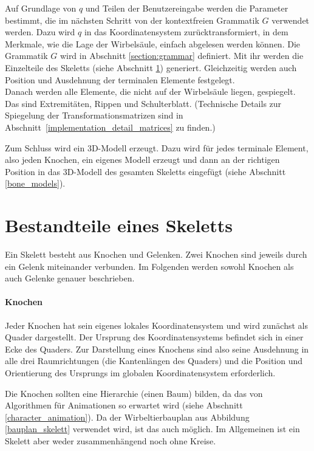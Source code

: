 Auf Grundlage von $q$ und Teilen der Benutzereingabe werden die Parameter bestimmt, die im nächsten Schritt von der kontextfreien Grammatik $G$ verwendet werden. Dazu wird $q$ in das Koordinatensystem zurücktransformiert, in dem Merkmale, wie die Lage der Wirbelsäule, einfach abgelesen werden können. Die Grammatik $G$ wird in Abschnitt \ref{section:grammar} definiert. Mit ihr werden die Einzelteile des Skeletts (siehe Abschnitt \ref{skeleton_parts}) generiert. Gleichzeitig werden auch Position und Ausdehnung der terminalen Elemente festgelegt.\\
Danach werden alle Elemente, die nicht auf der Wirbelsäule liegen, gespiegelt. Das sind Extremitäten, Rippen und Schulterblatt. (Technische Details zur Spiegelung der Transformationsmatrizen sind in \mbox{Abschnitt \ref{implementation_detail_matrices}} zu finden.)

Zum Schluss wird ein 3D-Modell erzeugt. Dazu wird für jedes terminale Element, also jeden Knochen, ein eigenes Modell erzeugt und dann an der richtigen Position in das 3D-Modell des gesamten Skeletts eingefügt (siehe Abschnitt \ref{bone_models}). 


\section{Bestandteile eines Skeletts}
\label{skeleton_parts}

Ein Skelett besteht aus Knochen und Gelenken. Zwei Knochen sind jeweils durch ein Gelenk miteinander verbunden. Im Folgenden werden sowohl Knochen als auch Gelenke genauer beschrieben.

\paragraph{Knochen}
Jeder Knochen hat sein eigenes lokales Koordinatensystem und wird zunächst als Quader dargestellt. Der Ursprung des Koordinatensystems befindet sich in einer Ecke des Quaders.
Zur Darstellung eines Knochens sind also
seine Ausdehnung in alle drei Raumrichtungen (die Kantenlängen des Quaders) und die Position und Orientierung des Ursprungs im globalen Koordinatensystem erforderlich.

Die Knochen sollten eine Hierarchie (einen Baum) bilden, da das von Algorithmen für Animationen so erwartet wird (siehe Abschnitt \ref{character_animation}). Da der Wirbeltierbauplan aus Abbildung \ref{bauplan_skelett} verwendet wird, ist das auch möglich. Im Allgemeinen ist ein Skelett aber weder zusammenhängend noch ohne Kreise.

